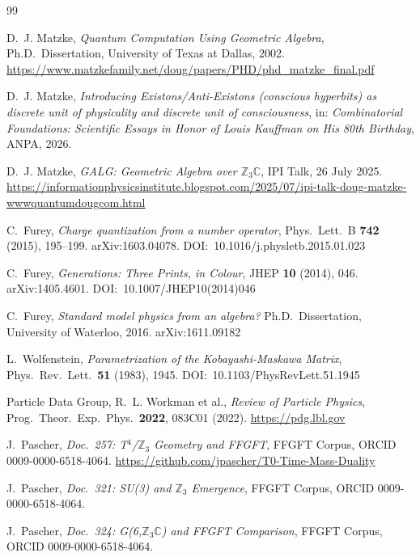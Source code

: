 \begin{thebibliography}{99}

D.~J. Matzke,
\textit{Quantum Computation Using Geometric Algebra},
Ph.D.\ Dissertation, University of Texas at Dallas, 2002.
\url{https://www.matzkefamily.net/doug/papers/PHD/phd_matzke_final.pdf}

D.~J. Matzke,
\textit{Introducing Existons/Anti-Existons (conscious hyperbits) as discrete unit of physicality and discrete unit of consciousness},
in: \textit{Combinatorial Foundations: Scientific Essays in Honor of Louis Kauffman on His 80th Birthday},
ANPA, 2026.

D.~J. Matzke,
\textit{GALG: Geometric Algebra over $\mathbb{Z}_3\mathbb{C}$},
IPI Talk, 26 July 2025.
\url{https://informationphysicsinstitute.blogspot.com/2025/07/ipi-talk-doug-matzke-wwwquantumdougcom.html}

C.~Furey,
\textit{Charge quantization from a number operator},
Phys.\ Lett.\ B \textbf{742} (2015), 195--199.
arXiv:1603.04078. DOI:~10.1016/j.physletb.2015.01.023

C.~Furey,
\textit{Generations: Three Prints, in Colour},
JHEP \textbf{10} (2014), 046.
arXiv:1405.4601. DOI:~10.1007/JHEP10(2014)046

C.~Furey,
\textit{Standard model physics from an algebra?}
Ph.D.\ Dissertation, University of Waterloo, 2016.
arXiv:1611.09182

L.~Wolfenstein,
\textit{Parametrization of the Kobayashi-Maskawa Matrix},
Phys.\ Rev.\ Lett.\ \textbf{51} (1983), 1945.
DOI:~10.1103/PhysRevLett.51.1945

Particle Data Group, R.~L. Workman et al.,
\textit{Review of Particle Physics},
Prog.\ Theor.\ Exp.\ Phys.\ \textbf{2022}, 083C01 (2022).
\url{https://pdg.lbl.gov}

J.~Pascher,
\textit{Doc.~257: T$^4$/$\mathbb{Z}_3$ Geometry and FFGFT},
FFGFT Corpus, ORCID 0009-0000-6518-4064.
\url{https://github.com/jpascher/T0-Time-Mass-Duality}

J.~Pascher,
\textit{Doc.~321: SU(3) and $\mathbb{Z}_3$ Emergence},
FFGFT Corpus, ORCID 0009-0000-6518-4064.

J.~Pascher,
\textit{Doc.~324: G(6,$\mathbb{Z}_3\mathbb{C}$) and FFGFT Comparison},
FFGFT Corpus, ORCID 0009-0000-6518-4064.

\end{thebibliography}
